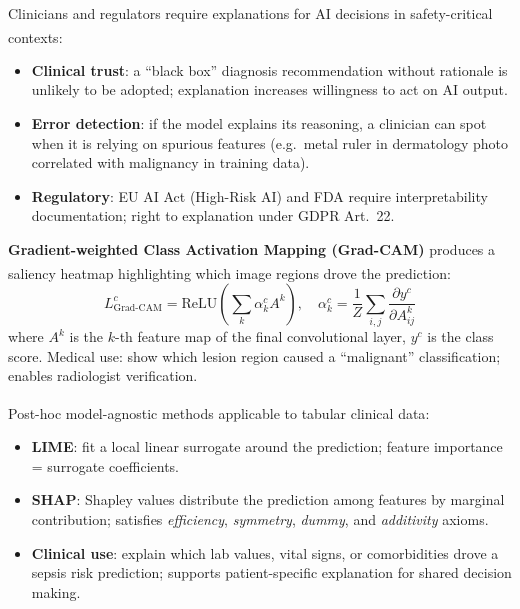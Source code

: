 \begin{tcbitemize}[ skin=sectionraster ]
    \tcbitem[title={Why Explainability Matters in Healthcare}, raster multicolumn=3]
    Clinicians and regulators require explanations for AI decisions in safety-critical contexts\textsuperscript{\cite[][pp.~1--10]{molnarInterpretableMachineLearning2019}}:
    \begin{itemize}
        \item \textbf{Clinical trust}: a ``black box'' diagnosis recommendation without rationale is unlikely to be adopted; explanation increases willingness to act on AI output.
        \item \textbf{Error detection}: if the model explains its reasoning, a clinician can spot when it is relying on spurious features (e.g.\ metal ruler in dermatology photo correlated with malignancy in training data).
        \item \textbf{Regulatory}: EU AI Act (High-Risk AI) and FDA require interpretability documentation; right to explanation under GDPR Art.~22.
    \end{itemize}

    \tcbitem[title={{Grad-CAM for Medical Images}}, raster multicolumn=3]
    \textbf{Gradient-weighted Class Activation Mapping (Grad-CAM)} produces a saliency heatmap highlighting which image regions drove the prediction\textsuperscript{\cite[][p.~619]{selvarajuGradCAMVisualExplanations2017}}:
    \begin{equation}
        L^c_{\text{Grad-CAM}} = \text{ReLU}\!\left(\sum_k \alpha_k^c A^k\right), \quad
        \alpha_k^c = \frac{1}{Z}\sum_{i,j} \frac{\partial y^c}{\partial A^k_{ij}}
    \end{equation}
    where $A^k$ is the $k$-th feature map of the final convolutional layer, $y^c$ is the class score.
    Medical use: show which lesion region caused a ``malignant'' classification; enables radiologist verification.

    \tcbitem[title={{LIME and SHAP in Clinical AI}}, raster multicolumn=3]
    Post-hoc model-agnostic methods applicable to tabular clinical data\textsuperscript{\cite[][pp.~85--110]{molnarInterpretableMachineLearning2019}}:
    \begin{itemize}
        \item \textbf{LIME}: fit a local linear surrogate around the prediction; feature importance = surrogate coefficients.
        \item \textbf{SHAP}: Shapley values distribute the prediction among features by marginal contribution; satisfies \textit{efficiency}, \textit{symmetry}, \textit{dummy}, and \textit{additivity} axioms.
        \item \textbf{Clinical use}: explain which lab values, vital signs, or comorbidities drove a sepsis risk prediction; supports patient-specific explanation for shared decision making.
    \end{itemize}


\end{tcbitemize}
